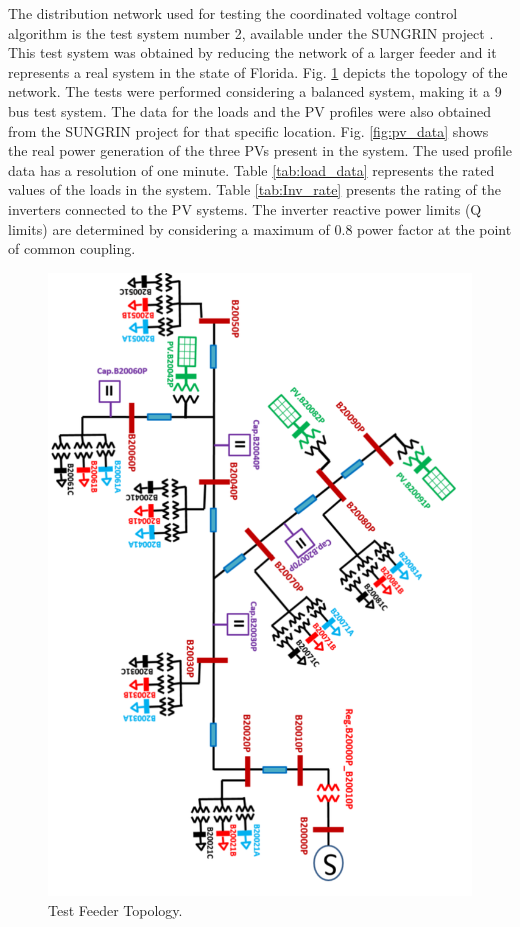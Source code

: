 The distribution network used for testing the coordinated voltage control algorithm is the test system number 2, available under the SUNGRIN project \cite{SG}. This test system was obtained by reducing the network of a larger feeder and it represents a real system in the state of Florida. Fig. \ref{fig:Feeder2} \cite{SG} depicts the topology of the network. The tests were performed considering a balanced system, making it a 9 bus test system. The data for the loads and the PV profiles were also obtained from the SUNGRIN project for that specific location. Fig. \ref{fig:pv_data} shows the real power generation of the three PVs present in the system. The used profile data has a resolution of one minute. Table \ref{tab:load_data} represents the rated values of the loads in the system. Table \ref{tab:Inv_rate} presents the rating of the inverters connected to the PV systems. The inverter reactive power limits (Q limits) are determined by considering a maximum of 0.8 power factor at the point of common coupling. 

\begin{figure}[!h]
\centering
\includegraphics[width=0.85\linewidth]{figs/CVC/feeder_r.png}
\caption{Test Feeder Topology.}
\label{fig:Feeder2}
\end{figure}

